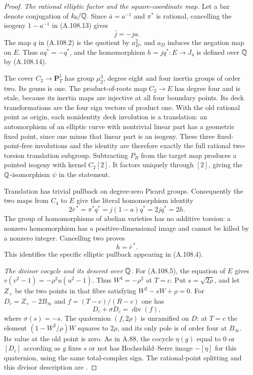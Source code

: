 \begin{proof}
\emph{The rational elliptic factor and the square-coordinate map.}
Let a bar denote conjugation of $k_0/\mathbb Q$.
Since $\bar a=a^{-1}$ and $\pi^*$ is rational,
cancelling the isogeny $1-a^{-1}$ in (A.108.13) gives
\[
              \bar j=-ja.
\tag{A.108.14}
\]
The map $q$ in (A.108.2) is the quotient by
$a_D^2$, and $a_D$ induces the negation map on $E$.
Thus $a q^*=-q^*$, and the homomorphism
$h=j q^*:E\to J_4$ is defined over $\mathbb Q$ by
(A.108.14).

The cover $C_2\to\mathbf P^1_T$ has group $\mu_2^3$,
degree eight and four inertia groups of order two.
Its genus is one.
The product-of-roots map $C_2\to E$ has degree four
and is etale, because its inertia maps are injective
at all four boundary points.
Its deck transformations are the four sign vectors
of product one.
With the old rational point as origin, each
nonidentity deck involution is a translation:
an automorphism of an elliptic curve with nontrivial
linear part has a geometric fixed point, since
one minus that linear part is an isogeny.
These three fixed-point-free involutions and the
identity are therefore exactly the full rational
two-torsion translation subgroup.
Subtracting $P_R$ from the target map produces a
pointed isogeny with kernel $C_2[2]$.
It factors uniquely through $[2]$, giving the
$\mathbb Q$-isomorphism $\psi$ in the statement.

Translation has trivial pullback on degree-zero
Picard groups.  Consequently the two maps from
$C_4$ to $E$ give the literal homomorphism identity
\[
      2\bar r^{\,*}=\pi^*q^*
                =j(1-a)q^*=2j q^*=2h.
\tag{A.108.15}
\]
The group of homomorphisms of abelian varieties
has no additive torsion: a nonzero homomorphism
has a positive-dimensional image and cannot be
killed by a nonzero integer.
Cancelling two proves
\[
                         h=\bar r^{\,*}.
\tag{A.108.16}
\]
This identifies the specific elliptic pullback
appearing in (A.108.4).

\emph{The divisor cocycle and its descent over $\mathbb Q$.}
For (A.108.5), the equation of $E$ gives
$v(v^2-1)=-\rho^2u(u^2-1)$.
Thus $W^4=-\rho^2$ at $T=c$.
Put $s=\sqrt{2\rho}$, and let $Z_+$ be the two
points in that fibre satisfying
$W^2-sW+\rho=0$.
For $D_c=Z_+-2B_\infty$ and
$f=(T-c)/(R-c)$ one has
\[
              D_c+\sigma D_c=\operatorname{div}(f),
\tag{A.108.17}
\]
where $\sigma(s)=-s$.
The quaternion $(f,2\rho)$ is unramified on $D$:
at $T=c$ the element $(1-W^2/\rho)W$ squares to
$2\rho$, and its only pole is of order four at
$B_\infty$.
Its value at the old point is zero.
As in A.88, the cocycle $\eta(g)$ equal to $0$
or $[D_c]$ according as $g$ fixes $s$ or not
has Hochschild--Serre image $-[\eta]$ for this
quaternion, using the same total-complex sign.
The rational-point splitting and this divisor
description are
\cite[Propositions 4.3.2 and 4.3.4, Remarks 4.3.3,
4.3.5 and 4.5.2]{AgentCTSkoro2019}.


\end{proof}
